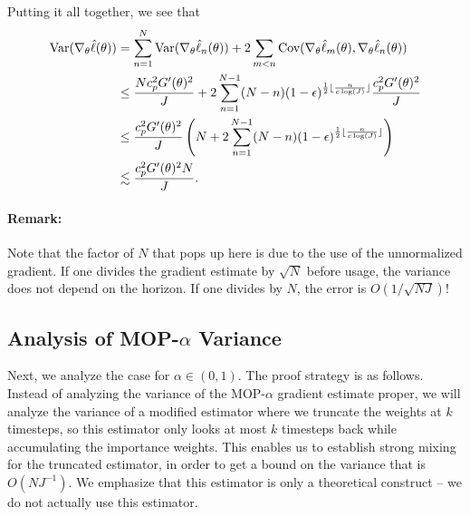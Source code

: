 \documentclass{article}
\begin{document}
Putting it all together, we see that
\begin{align*}
    \text{Var}(\nabla_\theta \hat\ell(\theta)) &= \sum_{n=1}^N \text{Var}(\nabla_\theta\hat\ell_n(\theta)) + 2\sum_{m<n} \text{Cov}(\nabla_\theta\hat\ell_m(\theta),\nabla_\theta\hat\ell_n(\theta))\\
    &\leq \frac{Nc_p^2G'(\theta)^2}{J} + 2\sum_{n=1}^{N-1} (N-n)(1-\epsilon)^{\frac{1}{2}\lfloor \frac{n}{c\log(J)} \rfloor}\frac{c_p^2G'(\theta)^2}{J} \\
    &\leq \frac{c_p^2G'(\theta)^2}{J} \left(N + 2\sum_{n=1}^{N-1} (N-n) (1-\epsilon)^{\frac{1}{2}\lfloor \frac{n}{c\log(J)} \rfloor}\right) \\
    &\lesssim \frac{c_p^2G'(\theta)^2N}{J}.
\end{align*}




\paragraph{Remark:} Note that the factor of $N$ that pops up here is due to the use of the unnormalized gradient. If one divides the gradient estimate by $\sqrt{N}$ before usage, the variance does not depend on the horizon. If one divides by $N$, the error is $O(1/\sqrt{NJ})$!




\subsection{Analysis of MOP-$\alpha$ Variance}

Next, we analyze the case for $\alpha \in (0,1)$. The proof strategy is as follows. Instead of analyzing the variance of the MOP-$\alpha$ gradient estimate proper, we will analyze the variance of a modified estimator where we truncate the weights at $k$ timesteps, so this estimator only looks at most $k$ timesteps back while accumulating the importance weights. This enables us to establish strong mixing for the truncated estimator, in order to get a bound on the variance that is $O(NJ^{-1})$. We emphasize that this estimator is only a theoretical construct -- we do not actually use this estimator. 
\end{document}
